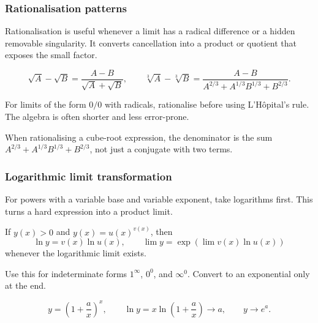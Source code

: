 \newpage
\subsubsection{Rationalisation patterns}
\begin{extension}
Rationalisation is useful whenever a limit has a radical difference or a
hidden removable singularity.  It converts cancellation into a product or
quotient that exposes the small factor.
\end{extension}

\begin{keyformula}[title={Useful Rationalisations}]
\[
\sqrt{A}-\sqrt{B}=\frac{A-B}{\sqrt A+\sqrt B},
\qquad
\sqrt[3]{A}-\sqrt[3]{B}=\frac{A-B}{A^{2/3}+A^{1/3}B^{1/3}+B^{2/3}}.
\]
\end{keyformula}

\begin{examtip}
For limits of the form \(0/0\) with radicals, rationalise before using
L'H\^opital's rule.  The algebra is often shorter and less error-prone.
\end{examtip}

\begin{commonmistake}
When rationalising a cube-root expression, the denominator is the sum
\(A^{2/3}+A^{1/3}B^{1/3}+B^{2/3}\), not just a conjugate with two terms.
\end{commonmistake}

\newpage
\subsubsection{Logarithmic limit transformation}
\begin{extension}
For powers with a variable base and variable exponent, take logarithms first.
This turns a hard expression into a product limit.
\end{extension}

\begin{keyformula}[title={Power-Limit Log Transformation}]
If \(y(x)>0\) and \(y(x)=u(x)^{v(x)}\), then
\[
\ln y=v(x)\ln u(x),
\qquad
\lim y=\exp\!\left(\lim v(x)\ln u(x)\right)
\]
whenever the logarithmic limit exists.
\end{keyformula}

\begin{examtip}
Use this for indeterminate forms \(1^\infty\), \(0^0\), and \(\infty^0\).
Convert to an exponential only at the end.
\end{examtip}

\begin{examplebox}[title={Standard Exponential Limit}]
\[
y=\left(1+\frac{a}{x}\right)^x,
\qquad
\ln y=x\ln\left(1+\frac{a}{x}\right)\to a,
\qquad
 y\to e^a.
\]
\end{examplebox}


